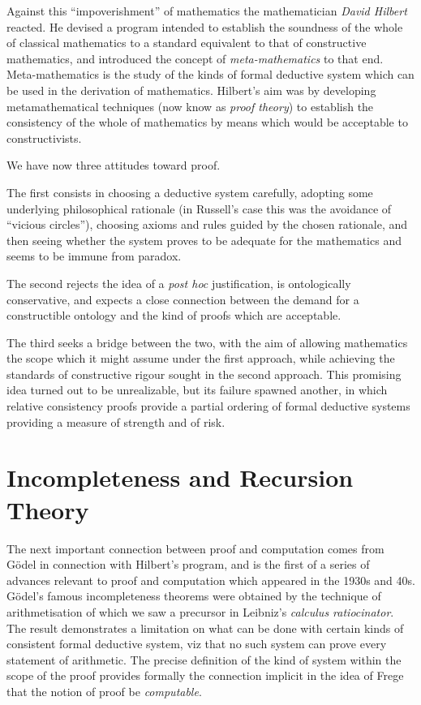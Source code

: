 Against this ``impoverishment'' of mathematics the mathematician
\emph{David Hilbert} reacted.
He devised a program intended to establish the soundness of the
whole of classical mathematics to a standard equivalent to that of
constructive mathematics, and introduced the concept of
\emph{meta-mathematics} to that end.
Meta-mathematics is the study of the kinds of formal deductive system
which can be used in the derivation of mathematics.
Hilbert's aim was by developing metamathematical techniques (now know
as \emph{proof theory}) to establish the consistency of the whole of
mathematics by means which would be acceptable to constructivists.

We have now three attitudes toward proof.

The first consists in choosing a deductive system carefully, adopting
some underlying philosophical rationale (in Russell's case this was
the avoidance of ``vicious circles''), choosing axioms and rules guided
by the chosen rationale, and then seeing whether the system proves to
be adequate for the mathematics and seems to be immune from paradox.

The second rejects the idea of a \emph{post hoc} justification, is
ontologically conservative, and expects a close connection between the
demand for a constructible ontology and the kind of proofs which are
acceptable.

The third seeks a bridge between the two, with the aim of allowing
mathematics the scope which it might assume under the first approach,
while achieving the standards of constructive rigour sought in the
second approach.
This promising idea turned out to be unrealizable, but its failure
spawned another, in which relative consistency proofs provide a
partial ordering of formal deductive systems providing a measure of
strength and of risk.

\section{Incompleteness and Recursion Theory}

The next important connection between proof and computation comes from
G\"odel in connection with Hilbert's program, and is the first of a
series of advances relevant to proof and computation which appeared in
the 1930s and 40s.
G\"odel's famous incompleteness theorems were obtained by the
technique of arithmetisation of which we saw a precursor in
Leibniz's \emph{calculus ratiocinator}.
The result demonstrates a limitation on what can be done with certain
kinds of consistent formal deductive system, viz that no such system
can prove every statement of arithmetic.
The precise definition of the kind of system within the scope of the
proof provides formally the connection implicit in the idea of Frege
that the notion of proof be \emph{computable}.

